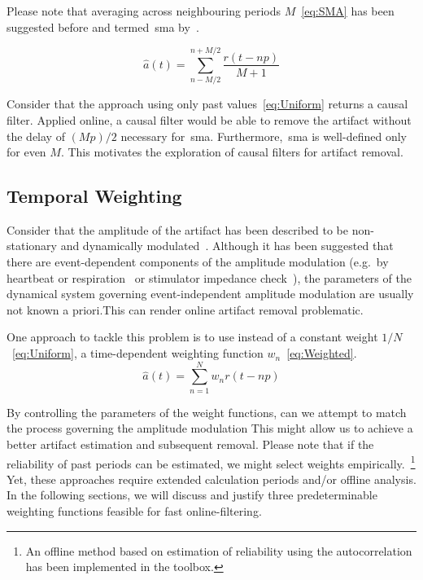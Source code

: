 \documentclass[a4paper]{article}
\begin{document}
Please note that averaging across neighbouring periods $M$~\eqref{eq:SMA} has been suggested before and termed~\gls{sma} by~\cite{Kohli_2015}.

\begin{equation}
    \hat{a}(t) = \sum_{n-M/2}^{n+M/2} \frac{r(t - np)}{M+1}\label{eq:SMA}
\end{equation}

Consider that the approach using only past values~\eqref{eq:Uniform} returns a causal filter. Applied online, a causal filter would be able to remove the artifact without the delay of $(Mp)/2$ necessary for~\gls{sma}. Furthermore,~\gls{sma} is well-defined only for even $M$. This motivates the exploration of causal filters for artifact removal.

\subsection{Temporal Weighting}

Consider that the amplitude of the  artifact has been described to be non-stationary and dynamically modulated~\citep{Noury_2016,Neuling_2017}.
Although it has been suggested that there are event-dependent components of the amplitude modulation (e.g.\ by heartbeat or respiration~\cite{Noury_2016} or stimulator impedance check~\cite{Neuling_2017}), the parameters of the dynamical system governing event-independent amplitude modulation are usually not known a priori.This can render online artifact removal problematic.

One approach to tackle this problem is to use instead of a constant weight $1/N$~\eqref{eq:Uniform}, a time-dependent weighting function $w_n$~\eqref{eq:Weighted}.
\begin{equation}
    \hat{a}(t) = \sum_{n=1}^{N} w_n r(t - np)\label{eq:Weighted}
\end{equation}

By controlling the parameters of the weight functions, can we attempt to match the process governing the amplitude modulation
This might allow us to achieve a better artifact estimation and subsequent removal. Please note that if the reliability of past periods can be estimated, we might select weights empirically.~\footnote{An offline method based on estimation of reliability using the autocorrelation has been implemented in the toolbox.}
Yet, these approaches require extended calculation periods and/or offline analysis. In the following sections, we will discuss and justify three predeterminable weighting functions feasible for fast online-filtering.
\end{document}
